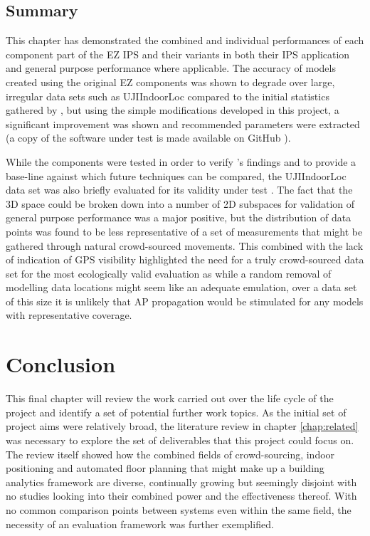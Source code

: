 \documentclass{UoYCSproject}
\begin{document}
        \section{Summary}
        
            This chapter has demonstrated the combined and individual performances of each component part of the EZ IPS and their variants in both their IPS application and general purpose performance where applicable. The accuracy of models created using the original EZ components was shown to degrade over large, irregular data sets such as UJIIndoorLoc compared to the initial statistics gathered by \citet{chintalapudi2010indoor}, but using the simple modifications developed in this project, a significant improvement was shown and recommended parameters were extracted (a copy of the software under test is made available on GitHub \citep{git}).
            
            While the components were tested in order to verify \citeauthor{chintalapudi2010indoor}'s findings and to provide a base-line against which future techniques can be compared, the UJIIndoorLoc data set was also briefly evaluated for its validity under test \citep{torres2014ujiindoorloc}. The fact that the 3D space could be broken down into a number of 2D subspaces for validation of general purpose performance was a major positive, but the distribution of data points was found to be less representative of a set of measurements that might be gathered through natural crowd-sourced movements. This combined with the lack of indication of GPS visibility highlighted the need for a truly crowd-sourced data set for the most ecologically valid evaluation as while a random removal of modelling data locations might seem like an adequate emulation, over a data set of this size it is unlikely that AP propagation would be stimulated for any models with representative coverage.
	
	\chapter{Conclusion}
    \label{chap:conclusion}
    
        This final chapter will review the work carried out over the life cycle of the project and identify a set of potential further work topics. As the initial set of project aims were relatively broad, the literature review in chapter \ref{chap:related} was necessary to explore the set of deliverables that this project could focus on. The review itself showed how the combined fields of crowd-sourcing, indoor positioning and automated floor planning that might make up a building analytics framework are diverse, continually growing but seemingly disjoint with no studies looking into their combined power and the effectiveness thereof. With no common comparison points between systems even within the same field, the necessity of an evaluation framework was further exemplified.
        
\end{document}
